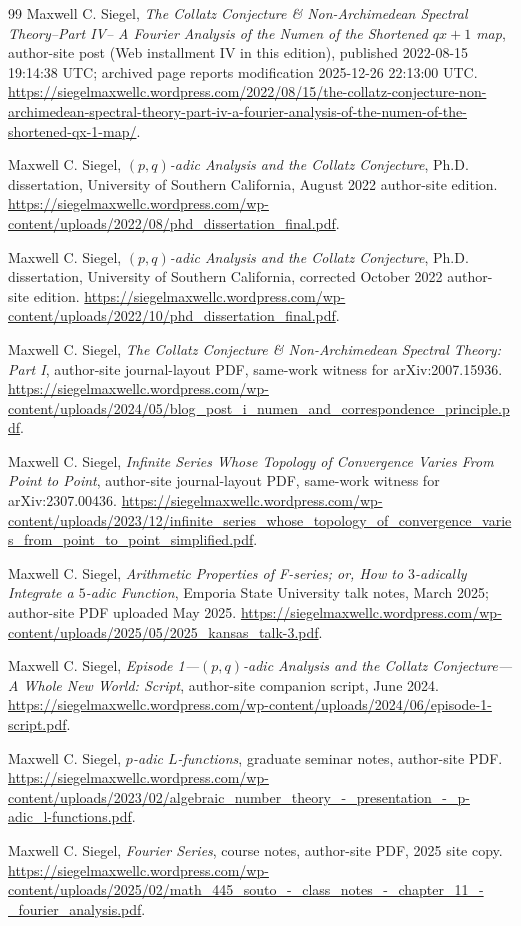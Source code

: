 \begin{thebibliography}{99}
Maxwell C. Siegel,
\emph{The Collatz Conjecture \& Non-Archimedean Spectral Theory--Part IV--
A Fourier Analysis of the Numen of the Shortened $qx+1$ map}, author-site
post (Web installment IV in this edition), published 2022-08-15 19:14:38
UTC; archived page reports modification 2025-12-26 22:13:00 UTC.
\url{https://siegelmaxwellc.wordpress.com/2022/08/15/the-collatz-conjecture-non-archimedean-spectral-theory-part-iv-a-fourier-analysis-of-the-numen-of-the-shortened-qx-1-map/}.

Maxwell C. Siegel,
\emph{$(p,q)$-adic Analysis and the Collatz Conjecture}, Ph.D. dissertation,
University of Southern California, August 2022 author-site edition.
\url{https://siegelmaxwellc.wordpress.com/wp-content/uploads/2022/08/phd_dissertation_final.pdf}.

Maxwell C. Siegel,
\emph{$(p,q)$-adic Analysis and the Collatz Conjecture}, Ph.D. dissertation,
University of Southern California, corrected October 2022 author-site
edition.  \url{https://siegelmaxwellc.wordpress.com/wp-content/uploads/2022/10/phd_dissertation_final.pdf}.

Maxwell C. Siegel,
\emph{The Collatz Conjecture \& Non-Archimedean Spectral Theory: Part I},
author-site journal-layout PDF, same-work witness for arXiv:2007.15936.
\url{https://siegelmaxwellc.wordpress.com/wp-content/uploads/2024/05/blog_post_i_numen_and_correspondence_principle.pdf}.

Maxwell C. Siegel,
\emph{Infinite Series Whose Topology of Convergence Varies From Point to
Point}, author-site journal-layout PDF, same-work witness for
arXiv:2307.00436.
\url{https://siegelmaxwellc.wordpress.com/wp-content/uploads/2023/12/infinite_series_whose_topology_of_convergence_varies_from_point_to_point_simplified.pdf}.

Maxwell C. Siegel,
\emph{Arithmetic Properties of F-series; or, How to $3$-adically Integrate
a $5$-adic Function}, Emporia State University talk notes, March 2025;
author-site PDF uploaded May 2025.
\url{https://siegelmaxwellc.wordpress.com/wp-content/uploads/2025/05/2025_kansas_talk-3.pdf}.

Maxwell C. Siegel,
\emph{Episode 1---$(p,q)$-adic Analysis and the Collatz Conjecture---A Whole
New World: Script}, author-site companion script, June 2024.
\url{https://siegelmaxwellc.wordpress.com/wp-content/uploads/2024/06/episode-1-script.pdf}.

Maxwell C. Siegel,
\emph{$p$-adic $L$-functions}, graduate seminar notes, author-site PDF.
\url{https://siegelmaxwellc.wordpress.com/wp-content/uploads/2023/02/algebraic_number_theory_-_presentation_-_p-adic_l-functions.pdf}.

Maxwell C. Siegel,
\emph{Fourier Series}, course notes, author-site PDF, 2025 site copy.
\url{https://siegelmaxwellc.wordpress.com/wp-content/uploads/2025/02/math_445_souto_-_class_notes_-_chapter_11_-_fourier_analysis.pdf}.

\end{thebibliography}
\endgroup
